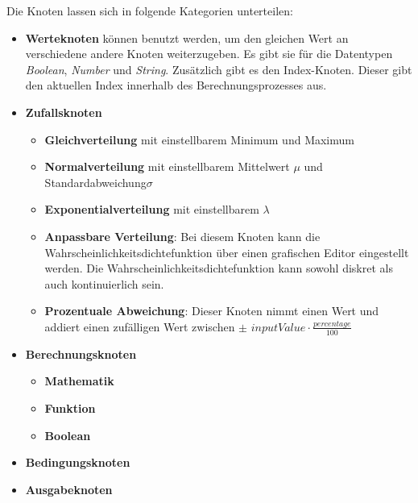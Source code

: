 Die Knoten lassen sich in folgende Kategorien unterteilen:
\begin{itemize}
    \item \textbf{Werteknoten} können benutzt werden, um den gleichen Wert an verschiedene andere Knoten weiterzugeben. Es gibt sie für die Datentypen \textit{Boolean}, \textit{Number} und \textit{String}. Zusätzlich gibt es den Index-Knoten. Dieser gibt den aktuellen Index innerhalb des Berechnungsprozesses aus.
    \item \textbf{Zufallsknoten}
    \begin{itemize}
        \item \textbf{Gleichverteilung} mit einstellbarem Minimum und Maximum
        \item \textbf{Normalverteilung} mit einstellbarem Mittelwert $\mu$ und Standardabweichung\nobreakspace $\sigma$
        \item \textbf{Exponentialverteilung} mit einstellbarem $\lambda$
        \item \textbf{Anpassbare Verteilung}: Bei diesem Knoten kann die Wahrscheinlichkeitsdichtefunktion über einen grafischen Editor eingestellt werden. Die Wahrscheinlichkeitsdichtefunktion kann sowohl diskret als auch kontinuierlich sein.
        \item \textbf{Prozentuale Abweichung}: Dieser Knoten nimmt einen Wert und addiert einen zufälligen Wert zwischen $\pm \, \, inputValue \cdot \frac{percentage}{100}$
    \end{itemize}
    \item \textbf{Berechnungsknoten}
    \begin{itemize}
        \item \textbf{Mathematik}
        \item \textbf{Funktion}
        \item \textbf{Boolean}
    \end{itemize}
    \item \textbf{Bedingungsknoten}
    \item \textbf{Ausgabeknoten}
\end{itemize}